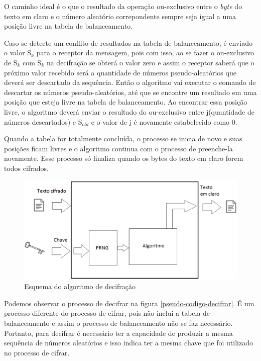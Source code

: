 O caminho ideal é o que o resultado da operação ou-exclusivo entre o \textit{byte} do texto em claro e o número aleatório correpondente sempre seja igual a uma posição livre na tabela de balanceamento.

Caso se detecte um conflito de resultados na tabela de balanceamento, é enviado o valor S$_k$ para o receptor da mensagem, pois com isso, ao se fazer o ou-exclusivo de S$_k$ com S$_k$ na decifração se obterá o valor zero e assim o receptor saberá que o próximo valor recebido será a quantidade de números pseudo-aleatórios que deverá ser descartado da sequência. Então o algoritmo vai executar o comando de descartar os números pseudo-aleatórios, até que se encontre um resultado em uma posição que esteja livre na tabela de balanceamento. Ao encontrar essa posição livre, o algoritmo deverá enviar o resultado do ou-exclusivo entre j(quantidade de números descartados) e S$_{old}$ e o valor de j é novamente estabelecido como 0.

Quando a tabela for totalmente concluída, o processo se inicia de novo e suas posições ficam livres e o algoritmo continua com o processo de preenche-la novamente. Esse processo só finaliza quando os bytes do texto em claro forem todos cifrados. 

\begin{figure}[h]
	\centering
	\includegraphics[scale=0.6]{figuras/metodo_de_decifra.eps}
	\caption{Esquema do algoritmo de decifração}
\end{figure}

Podemos observar o processo de decifrar na figura \ref{pseudo-codigo-decifrar}. É um processo diferente do processo de cifrar, pois não inclui a tabela de balanceamento e assim o processo de balanceamento não se faz necessário. Portanto, para decifrar é necessário ter a capacidade de produzir a mesma sequência de números aleatórios e isso indica ter a mesma chave que foi utilizado no processo de cifrar. 


